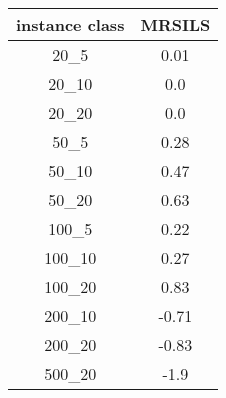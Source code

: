 \begin{tabular}{c|c|}
instance class & MRSILS \\ 
\hline
20_5         & 0.01         \\ 
20_10        & 0.0          \\ 
20_20        & 0.0          \\ 
50_5         & 0.28         \\ 
50_10        & 0.47         \\ 
50_20        & 0.63         \\ 
100_5        & 0.22         \\ 
100_10       & 0.27         \\ 
100_20       & 0.83         \\ 
200_10       & -0.71        \\ 
200_20       & -0.83        \\ 
500_20       & -1.9         \\ 
\end{tabular}